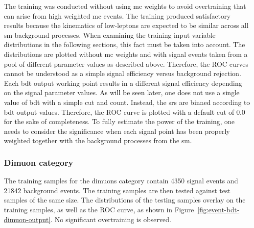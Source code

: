The training was conducted without using \gls{mc} weights to avoid overtraining that can arise from high weighted \gls{mc} events. The training produced satisfactory results because the kinematics of low-\pt leptons are expected to be similar across all \gls{sm} background processes. When examining the training input variable distributions in the following sections, this fact must be taken into account. The distributions are plotted without \gls{mc} weights and with signal events taken from a pool of different parameter values as described above. Therefore, the ROC curves cannot be understood as a simple signal efficiency versus background rejection. Each \gls{bdt} output working point results in a different signal efficiency depending on the signal parameter values. As will be seen later, one does not use a single value of \gls{bdt} with a simple cut and count. Instead, the \glspl{sr} are binned according to \gls{bdt} output values. Therefore, the ROC curve is plotted with a default cut of 0.0 for the sake of completeness. To fully estimate the power of the training, one needs to consider the significance when each signal point has been properly weighted together with the background processes from the \gls{sm}.

\subsubsection{Dimuon category}

The training samples for the dimuons category contain 4350 signal events and 21842 background events. The training samples are then tested against test samples of the same size. The distributions of the testing samples overlay on the training samples, as well as the ROC curve, as shown in Figure~\ref{fig:event-bdt-dimuon-output}. No significant overtraining is observed.

